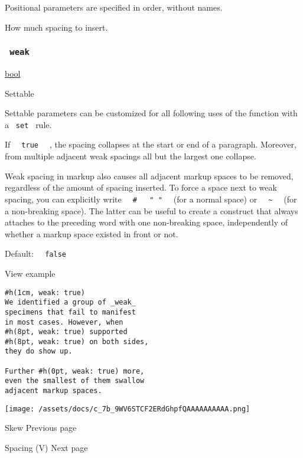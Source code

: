 \label{parameters-amount-positional-tooltip}
Positional parameters are specified in order, without names.

How much spacing to insert.

\subsubsection{\texorpdfstring{\texttt{\ weak\ }}{ weak }}\label{parameters-weak}

\href{/docs/reference/foundations/bool/}{bool}

{{ Settable }}

\label{parameters-weak-settable-tooltip}
Settable parameters can be customized for all following uses of the
function with a \texttt{\ set\ } rule.

If \texttt{\ }{\texttt{\ true\ }}\texttt{\ } , the spacing collapses at
the start or end of a paragraph. Moreover, from multiple adjacent weak
spacings all but the largest one collapse.

Weak spacing in markup also causes all adjacent markup spaces to be
removed, regardless of the amount of spacing inserted. To force a space
next to weak spacing, you can explicitly write
\texttt{\ }{\texttt{\ \#\ }}\texttt{\ }{\texttt{\ "\ "\ }}\texttt{\ }
(for a normal space) or
\texttt{\ }{\texttt{\ \textasciitilde{}\ }}\texttt{\ } (for a
non-breaking space). The latter can be useful to create a construct that
always attaches to the preceding word with one non-breaking space,
independently of whether a markup space existed in front or not.

Default: \texttt{\ }{\texttt{\ false\ }}\texttt{\ }


View example

\begin{verbatim}
#h(1cm, weak: true)
We identified a group of _weak_
specimens that fail to manifest
in most cases. However, when
#h(8pt, weak: true) supported
#h(8pt, weak: true) on both sides,
they do show up.

Further #h(0pt, weak: true) more,
even the smallest of them swallow
adjacent markup spaces.
\end{verbatim}

\texttt{[image: /assets/docs/c\_7b\_9WV6STCF2ERdGhpfQAAAAAAAAAA.png]}

\href{/docs/reference/layout/skew/}{\pandocbounded{}}

{ Skew } { Previous page }

\href{/docs/reference/layout/v/}{\pandocbounded{}}

{ Spacing (V) } { Next page }
